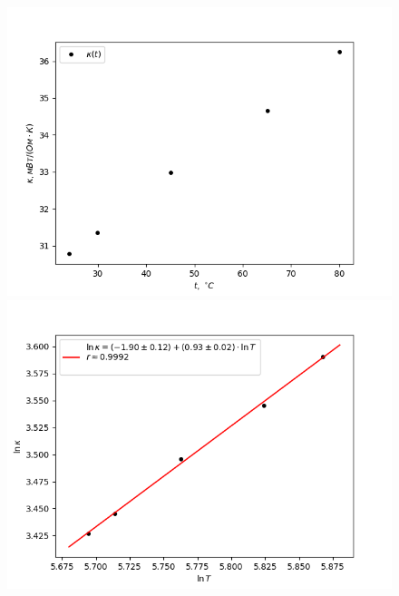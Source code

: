 \documentclass[a4paper,12pt]{article} %
\begin{document}
\begin{figure}
\begin{minipage}{\linewidth}
\centering
\includegraphics[scale=1]{kappat.png}
\caption{}
\end{minipage}
\begin{minipage}{\linewidth}
\centering
\includegraphics[scale=1]{lnklnt.png}
\caption{}
\end{minipage}
\end{figure}
	
\end{document}
